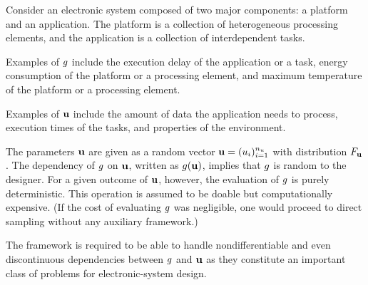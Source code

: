 Consider an electronic system composed of two major components: a platform and
an application. The platform is a collection of heterogeneous processing
elements, and the application is a collection of interdependent tasks.

 Examples of $g$ include the execution delay of the application or
a task, energy consumption of the platform or a processing element, and maximum
temperature of the platform or a processing element.

 Examples of $\mathbf{u}$ include the amount of data the
application needs to process, execution times of the tasks, and properties of
the environment.

The parameters $\mathbf{u}$ are given as a random vector $\mathbf{u} = (u_i)_{i = 1}^{n_u}$
with distribution $F_{\mathbf{u}}$. The dependency of $g$ on $\mathbf{u}$, written
as $g(\mathbf{u})$, implies that $g$ is random to the designer. For a given outcome
of $\mathbf{u}$, however, the evaluation of $g$ is purely deterministic. This
operation is assumed to be doable but computationally expensive. (If the cost of
evaluating $g$ was negligible, one would proceed to direct sampling without any
auxiliary framework.)

 The framework is required to be able to handle
nondifferentiable and even discontinuous dependencies between $g$ and $\mathbf{u}$ as
they constitute an important class of problems for electronic-system design.

